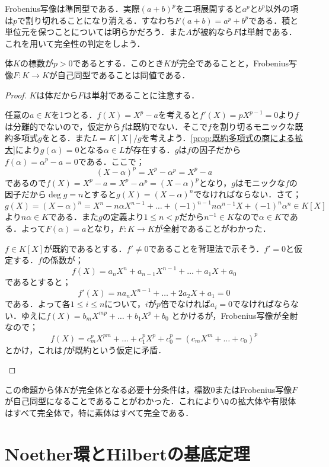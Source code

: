 Frobenius写像は準同型である．実際$(a+b)^p$を二項展開すると$a^p$と$b^p$以外の項は$p$で割り切れることになり消える．すなわち$F(a+b)=a^p+b^p$である．積と単位元を保つことについては明らかだろう．また$A$が被約なら$F$は単射である．これを用いて完全性の判定をしよう．
\begin{prop}[体の完全性の判定]
	体$K$の標数が$p>0$であるとする．このとき$K$が完全であることと，Frobenius写像$F:K\to K$が自己同型であることは同値である．
\end{prop}
\begin{proof}
	$K$は体だから$F$は単射であることに注意する．
	\begin{eqv}
		\item 	
		任意の$a\in K$を1つとる．$f(X)=X^p-a$を考えると$f'(X)=pX^{p-1}=0$より$f$は分離的でないので，仮定から$f$は既約でない．そこで$f$を割り切るモニックな既約多項式$g$をとる．また$L=K[X]/g$を考えよう．\ref{prop:既約多項式の商による拡大}により$g(\alpha)=0$となる$\alpha\in L$が存在する．$g$は$f$の因子だから$f(\alpha)=\alpha^p-a=0$である．ここで；
		\[(X-\alpha)^p=X^p-\alpha^p=X^p-a\]
		であるので$f(X)=X^p-a=X^p-\alpha^p=(X-\alpha)^p$となり，$g$はモニックな$f$の因子だから$\deg{g}=n$とすると$g(X)=(X-\alpha)^n$でなければならない．さて；
		\[g(X)=(X-\alpha)^n=X^n-n\alpha X^{n-1}+\dots+(-1)^{n-1}n\alpha^{n-1}X+(-1)^n\alpha^n\in K[X]\]
		より$n\alpha\in K$である．また$g$の定義より$1\leq n<p$だから$n^{-1}\in K$なので$\alpha\in K$である．よって$F(\alpha)=a$となり，$F:K\to K$が全射であることがわかった．
		\item 
		$f\in K[X]$が既約であるとする．$f'\neq0$であることを背理法で示そう．$f'=0$と仮定する．$f$の係数が；
		\[f(X)=a_nX^n+a_{n-1}X^{n-1}+\dots+a_1X+a_0\]
		であるとすると；
		\[f'(X)=na_nX^{n-1}+\dots+2a_2X+a_1=0\]
		である．よって各$1\leq i\leq n$について，$i$が$p$倍でなければ$a_i=0$でなければならない．ゆえに$f(X)=b_mX^{mp}+\dots+b_1X^p+b_0$
		とかけるが，Frobenius写像が全射なので；
		\[f(X)=c_m^pX^{pm}+\dots+c_1^pX^p+c_0^p=(c_mX^m+\dots+c_0)^p\]
		とかけ，これは$f$が既約という仮定に矛盾．
	\end{eqv}
\end{proof}

この命題から体$K$が完全体となる必要十分条件は，標数0またはFrobenius写像$F$が自己同型になることであることがわかった．これにより$\Q$の拡大体や有限体はすべて完全体で，特に素体はすべて完全である．

\section{Noether環とHilbertの基底定理}

